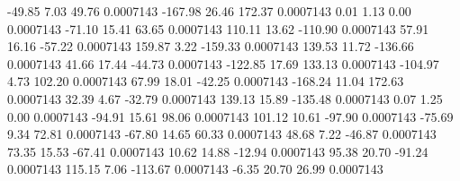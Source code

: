       -49.85        7.03       49.76     0.0007143
     -167.98       26.46      172.37     0.0007143
        0.01        1.13        0.00     0.0007143
      -71.10       15.41       63.65     0.0007143
      110.11       13.62     -110.90     0.0007143
       57.91       16.16      -57.22     0.0007143
      159.87        3.22     -159.33     0.0007143
      139.53       11.72     -136.66     0.0007143
       41.66       17.44      -44.73     0.0007143
     -122.85       17.69      133.13     0.0007143
     -104.97        4.73      102.20     0.0007143
       67.99       18.01      -42.25     0.0007143
     -168.24       11.04      172.63     0.0007143
       32.39        4.67      -32.79     0.0007143
      139.13       15.89     -135.48     0.0007143
        0.07        1.25        0.00     0.0007143
      -94.91       15.61       98.06     0.0007143
      101.12       10.61      -97.90     0.0007143
      -75.69        9.34       72.81     0.0007143
      -67.80       14.65       60.33     0.0007143
       48.68        7.22      -46.87     0.0007143
       73.35       15.53      -67.41     0.0007143
       10.62       14.88      -12.94     0.0007143
       95.38       20.70      -91.24     0.0007143
      115.15        7.06     -113.67     0.0007143
       -6.35       20.70       26.99     0.0007143
